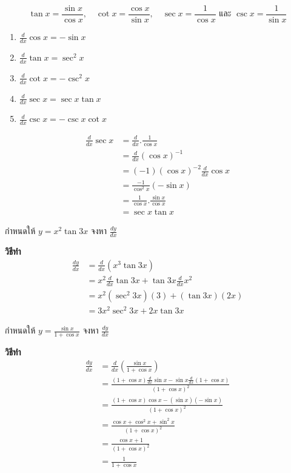 \documentclass[
]{book}
\begin{document}
\[\tan x= \frac{\sin x}{\cos x}, \quad \cot x=\frac{\cos x}{\sin
x}, \quad \sec x=\frac{1}{\cos x} \text{ และ } \displaystyle \csc x=\frac{1}{\sin x}\]

\begin{enumerate}
\def\labelenumi{\arabic{enumi}.}
\item
  \(\displaystyle\frac{d}{dx}\cos x=-\sin x\)
\item
  \(\displaystyle\frac{d}{dx}\tan x=\sec^{2} x\)
\item
  \(\displaystyle\frac{d}{dx}\cot x=-\csc^{2} x\)
\item
  \(\displaystyle\frac{d}{dx}\sec x=\sec x \tan x\)
\item
  \(\displaystyle\frac{d}{dx}\csc x=-\csc x\cot x\)
\end{enumerate}

\begin{equation}   \begin{aligned}
\displaystyle \frac{d}{dx}\sec x&=\frac{d}{dx}.\frac{1}{\cos x}\\
&=\frac{d}{dx}(\cos x)^{-1}\\
&=(-1)(\cos x)^{-2}\displaystyle \frac{d}{dx}\cos x\\
&=\displaystyle \frac{-1}{\cos^{2} x}(-\sin x)\\
&=\displaystyle \frac{1}{\cos x}.\frac{\sin x}{\cos x}\\
&=\sec x\tan x
  \end{aligned} \end{equation}

กำหนดให้ \(y=x^{2}\tan 3x\) จงหา \(\displaystyle
\frac{dy}{dx}\)

\textbf{วิธีทำ} \begin{equation}   \begin{aligned}
\displaystyle \frac{dy}{dx}&=\frac{d}{dx}(x^{3}\tan 3x)\\
&=x^{2}\displaystyle \frac{d}{dx}\tan 3x+\tan 3x\frac{d}{dx}x^{2}\\
&=x^{2}(\sec^{2}3x)(3)+(\tan 3x)(2x)\\
&=3x^{2}\sec^{2}3x+2x\tan 3x
  \end{aligned} \end{equation}

กำหนดให้ \(\displaystyle y=\frac{\sin x}{1+\cos x}\) จงหา
\(\displaystyle \frac{dy}{dx}\)

\textbf{วิธีทำ} \begin{equation}   \begin{aligned}
\displaystyle \frac{dy}{dx}&=\frac{d}{dx}(\frac{\sin x}{1+\cos x})\\
&=\frac{(1+\cos x)\displaystyle \frac{d}{dx}\sin x -\sin x\displaystyle
\frac{d}{dx}(1+\cos x)}{(1+\cos x)^{2}}\\
&=\frac{(1+\cos x)\cos x-(\sin x)(-\sin x)}{(1+\cos x)^{2}}\\
&=\frac{\cos x+\cos^{2}x+\sin^{2}x }{(1+\cos x)^{2}}\\
&=\frac{\cos x+1}{(1+\cos x)^{2}}\\
&=\frac{1}{1+\cos x}
  \end{aligned} \end{equation}
\end{document}
